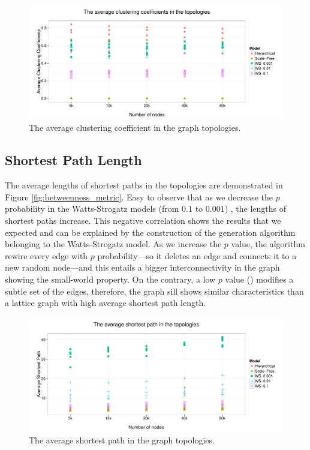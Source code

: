 \begin{figure}[!ht]
	\centering
	\includegraphics[width=160mm, keepaspectratio]{figures/clustering_metric.pdf}
	\caption{The average clustering coefficient in the graph topologies.}
	\label{fig:clustering_metric}
\end{figure}

\subsection{Shortest Path Length}

The average lengths of shortest paths in the topologies are demonstrated in Figure \ref{fig:betweenness_metric}. Easy to observe that as we decrease the $p$ probability in the Watts-Strogatz models (from $0.1$ to $0.001$) , the lengths of shortest paths increase. This negative correlation shows the results that we expected and can be explained by the construction of the generation algorithm belonging to the Watts-Strogatz model. As we increase the $p$ value, the algorithm rewire every edge with $p$ probability---so it deletes an edge and connects it to a new random node---and this entails a bigger interconnectivity in the graph showing the small-world property. On the contrary, a low $p$ value () modifies a subtle set of the edges, therefore, the graph sill shows similar characteristics than a lattice graph with high average shortest path length.

\begin{figure}[!ht]
	\centering
	\includegraphics[width=160mm, keepaspectratio]{figures/avg_sp_metric.pdf}
	\caption{The average shortest path in the graph topologies.}
	\label{fig:avg_shortest_path}
\end{figure}

